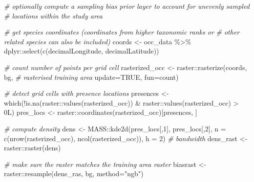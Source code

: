 \documentclass[
]{article}
\newenvironment{Shaded}{\begin{snugshade}}{\end{snugshade}}
\newcommand{\AttributeTok}[1]{\textcolor[rgb]{0.77,0.63,0.00}{#1}}
\newcommand{\CommentTok}[1]{\textcolor[rgb]{0.56,0.35,0.01}{\textit{#1}}}
\newcommand{\ConstantTok}[1]{\textcolor[rgb]{0.00,0.00,0.00}{#1}}
\newcommand{\DecValTok}[1]{\textcolor[rgb]{0.00,0.00,0.81}{#1}}
\newcommand{\FunctionTok}[1]{\textcolor[rgb]{0.00,0.00,0.00}{#1}}
\newcommand{\NormalTok}[1]{#1}
\newcommand{\OtherTok}[1]{\textcolor[rgb]{0.56,0.35,0.01}{#1}}
\newcommand{\SpecialCharTok}[1]{\textcolor[rgb]{0.00,0.00,0.00}{#1}}
\newcommand{\StringTok}[1]{\textcolor[rgb]{0.31,0.60,0.02}{#1}}
\begin{document}
\begin{Shaded}
\begin{Highlighting}[]
\CommentTok{\# optionally compute a sampling bias prior layer to account for unevenly sampled}
\CommentTok{\# locations within the study area}

\CommentTok{\# get species coordinates (coordinates from higher taxonomic ranks or }
\CommentTok{\# other related species can also be included)}
\NormalTok{coords }\OtherTok{\textless{}{-}}\NormalTok{ occ\_data }\SpecialCharTok{\%\textgreater{}\%}
\NormalTok{  dplyr}\SpecialCharTok{::}\FunctionTok{select}\NormalTok{(}\FunctionTok{c}\NormalTok{(decimalLongitude, decimalLatitude))}

\CommentTok{\# count number of points per grid cell}
\NormalTok{rasterized\_occ }\OtherTok{\textless{}{-}}\NormalTok{ raster}\SpecialCharTok{::}\FunctionTok{rasterize}\NormalTok{(coords,}
\NormalTok{                                    bg,         }\CommentTok{\# rasterised training area}
                                    \AttributeTok{update=}\ConstantTok{TRUE}\NormalTok{,}
                                    \AttributeTok{fun=}\StringTok{\textquotesingle{}count\textquotesingle{}}\NormalTok{)}

\CommentTok{\# detect grid cells with presence locations}
\NormalTok{presences }\OtherTok{\textless{}{-}} \FunctionTok{which}\NormalTok{(}\SpecialCharTok{!}\FunctionTok{is.na}\NormalTok{(raster}\SpecialCharTok{::}\FunctionTok{values}\NormalTok{(rasterized\_occ)) }\SpecialCharTok{\&}
\NormalTok{                     raster}\SpecialCharTok{::}\FunctionTok{values}\NormalTok{(rasterized\_occ) }\SpecialCharTok{\textgreater{}}\NormalTok{ 0L)}
\NormalTok{pres\_locs }\OtherTok{\textless{}{-}}\NormalTok{ raster}\SpecialCharTok{::}\FunctionTok{coordinates}\NormalTok{(rasterized\_occ)[presences, ]}

\CommentTok{\# compute density}
\NormalTok{dens }\OtherTok{\textless{}{-}}\NormalTok{ MASS}\SpecialCharTok{::}\FunctionTok{kde2d}\NormalTok{(pres\_locs[,}\DecValTok{1}\NormalTok{], pres\_locs[,}\DecValTok{2}\NormalTok{],}
                    \AttributeTok{n =} \FunctionTok{c}\NormalTok{(}\FunctionTok{nrow}\NormalTok{(rasterized\_occ), }\FunctionTok{ncol}\NormalTok{(rasterized\_occ)),}
                    \AttributeTok{h =} \DecValTok{2}\NormalTok{) }\CommentTok{\# bandwidth}
\NormalTok{dens\_rast }\OtherTok{\textless{}{-}}\NormalTok{ raster}\SpecialCharTok{::}\FunctionTok{raster}\NormalTok{(dens)}

\CommentTok{\# make sure the raster matches the training area raster}
\NormalTok{biasrast }\OtherTok{\textless{}{-}}\NormalTok{ raster}\SpecialCharTok{::}\FunctionTok{resample}\NormalTok{(dens\_ras, bg, }\AttributeTok{method=}\StringTok{"ngb"}\NormalTok{)}


\end{Highlighting}
\end{Shaded}
\end{document}
